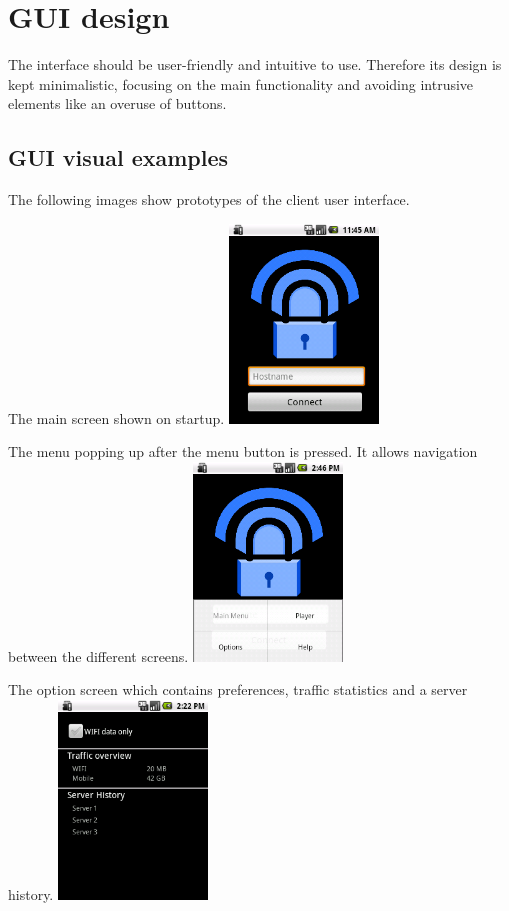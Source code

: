 \documentclass[a4paper,10pt]{scrartcl}
\begin{document}
\section{GUI design}
The interface should be user-friendly and intuitive to use. Therefore its design is kept minimalistic, focusing
on the main functionality and avoiding intrusive elements like an overuse of buttons.

\subsection{GUI visual examples}
The following images show prototypes of the client user interface.

\begin{illustration}{The main screen shown on startup.}
\includegraphics[width=150px]{figures/images/mainscreen.png}
\end{illustration}
\begin{illustration}{The menu popping up after the menu button is pressed.
   It allows navigation between the different screens.}
\includegraphics[width=150px]{figures/images/menu.png}
\end{illustration}
\begin{illustration}{The option screen which contains preferences, traffic statistics and a server history.}
\includegraphics[width=150px]{figures/images/optionscreen.png}
\end{illustration}
\end{document}
